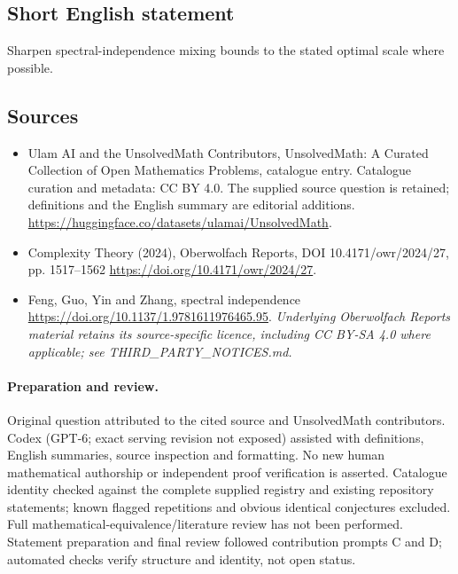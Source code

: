 \documentclass[11pt]{article}
\begin{document}
\subsection{Short English statement}
Sharpen spectral-independence mixing bounds to the stated optimal scale where possible.
\subsection{Sources}
\begin{itemize}
\item[\hypertarget{source:statement:1}{S1}] Ulam AI and the UnsolvedMath Contributors, UnsolvedMath: A Curated Collection of Open Mathematics Problems, catalogue entry. Catalogue curation and metadata: CC BY 4.0. The supplied source question is retained; definitions and the English summary are editorial additions.
\url{https://huggingface.co/datasets/ulamai/UnsolvedMath}.
\item[\hypertarget{source:statement:2}{S2}] Complexity Theory (2024), Oberwolfach Reports, DOI 10.4171/owr/2024/27, pp. 1517--1562
\url{https://doi.org/10.4171/owr/2024/27}.
\item[\hypertarget{source:statement:3}{S3}] Feng, Guo, Yin and Zhang, spectral independence
\url{https://doi.org/10.1137/1.9781611976465.95}.
\textit{Underlying Oberwolfach Reports material retains its source-specific licence, including CC BY-SA 4.0 where applicable; see THIRD\_PARTY\_NOTICES.md.}
\end{itemize}
\paragraph{Preparation and review.}
Original question attributed to the cited source and UnsolvedMath contributors. Codex (GPT-6; exact serving revision not exposed) assisted with definitions, English summaries, source inspection and formatting. No new human mathematical authorship or independent proof verification is asserted. Catalogue identity checked against the complete supplied registry and existing repository statements; known flagged repetitions and obvious identical conjectures excluded. Full mathematical-equivalence/literature review has not been performed. Statement preparation and final review followed contribution prompts C and D; automated checks verify structure and identity, not open status.
\label{end:statement}
\end{document}
